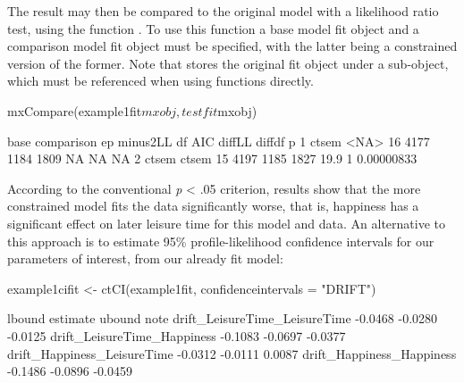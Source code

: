 \documentclass[nojss]{jss}\usepackage[]{graphicx}\usepackage[]{color}
\begin{document}
\begin{Schunk}
\end{Schunk}

The result may then be compared to the original model with a likelihood ratio test, using the  function . To use this function a base model fit object and a comparison model fit object must be specified, with the latter being a constrained version of the former. Note that  stores the original  fit object under a  sub-object, which must be referenced when using  functions directly.
\begin{Schunk}
\begin{Sinput}
mxCompare(example1fit$mxobj, testfit$mxobj)
\end{Sinput}
\begin{Soutput}
   base comparison ep minus2LL   df  AIC diffLL diffdf          p
1 ctsem       <NA> 16     4177 1184 1809     NA     NA         NA
2 ctsem      ctsem 15     4197 1185 1827   19.9      1 0.00000833
\end{Soutput}
\end{Schunk}
According to the conventional \textit{p} < .05 criterion, results show that the more constrained model fits the data significantly worse, that is, happiness has a significant effect on later leisure time for this model and data. 
An alternative to this approach is to estimate 95\% profile-likelihood confidence intervals for our parameters of interest, from our already fit model:

\begin{Schunk}
\begin{Sinput}
example1cifit <- ctCI(example1fit, confidenceintervals = "DRIFT")
\end{Sinput}
\begin{Soutput}
                               lbound estimate  ubound note
drift_LeisureTime_LeisureTime -0.0468  -0.0280 -0.0125     
drift_LeisureTime_Happiness   -0.1083  -0.0697 -0.0377     
drift_Happiness_LeisureTime   -0.0312  -0.0111  0.0087     
drift_Happiness_Happiness     -0.1486  -0.0896 -0.0459     
\end{Soutput}
\end{Schunk}
\end{document}
